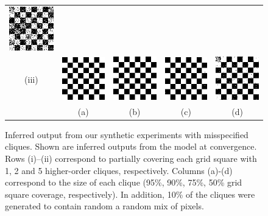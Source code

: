 \documentclass[10pt,journal,letterpaper,compsoc]{IEEEtran}
\begin{document}
\begin{figure}[t]
\begin{tabular}{ccccc}
    \includegraphics[width=0.18\linewidth]{figures/synth_corrupt/synth_corrupt_2_4} \\
    \small {(iii)} & 
    \includegraphics[width=0.18\linewidth]{figures/synth_corrupt/synth_corrupt_3_1} &
    \includegraphics[width=0.18\linewidth]{figures/synth_corrupt/synth_corrupt_3_2} &
    \includegraphics[width=0.18\linewidth]{figures/synth_corrupt/synth_corrupt_3_3} &
    \includegraphics[width=0.18\linewidth]{figures/synth_corrupt/synth_corrupt_3_4} \\
    & {\small (a)} & {\small (b)} & {\small (c)} & {\small (d)}
  \end{tabular}
  \caption{\label{fig:synth_corrupt_results} Inferred output from our
    synthetic experiments with misspecified cliques. Shown are
    inferred outputs from the model at convergence. Rows (i)--(ii)
    correspond to partially covering each grid square with 1, 2 and 5
    higher-order cliques, respectively. Columns (a)-(d) correspond to
    the size of each clique (95\%, 90\%, 75\%, 50\% grid square
    coverage, respectively). In addition, 10\% of the cliques were
    generated to contain random a random mix of pixels.}
\end{figure}
\end{document}
